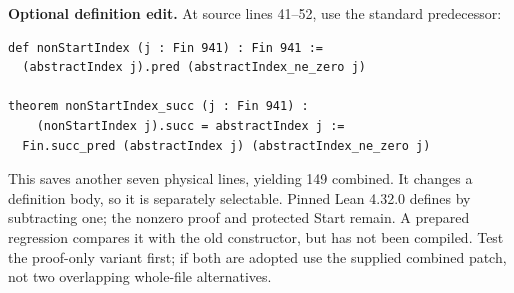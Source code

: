 \textbf{Optional definition edit.} At source lines 41--52, use the standard predecessor:
\begin{lstlisting}
def nonStartIndex (j : Fin 941) : Fin 941 :=
  (abstractIndex j).pred (abstractIndex_ne_zero j)

theorem nonStartIndex_succ (j : Fin 941) :
    (nonStartIndex j).succ = abstractIndex j :=
  Fin.succ_pred (abstractIndex j) (abstractIndex_ne_zero j)
\end{lstlisting}
This saves another seven physical lines, yielding 149 combined. It changes a definition body, so it is separately selectable. Pinned Lean 4.32.0 defines  by subtracting one; the nonzero proof and protected Start remain. A prepared  regression compares it with the old constructor, but has not been compiled. Test the proof-only variant first; if both are adopted use the supplied combined patch, not two overlapping whole-file alternatives.
